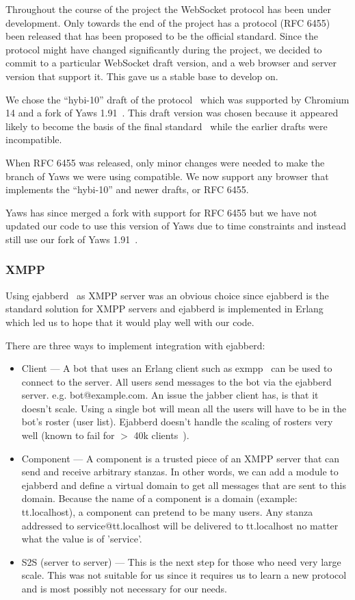 \documentclass[11pt,a4paper]{report}
\begin{document}
Throughout the course of the project the WebSocket protocol has
been under development. Only towards the end of the project has a protocol
(RFC 6455) been released that has been proposed to be the official standard.
Since the protocol might have changed significantly during the project, we
decided to commit to a particular WebSocket draft version, and a web browser and
server version that support it. This gave us a stable base to develop on.

We chose the ``hybi-10'' draft of the protocol~\cite{hybi-10} which was
supported by Chromium 14 and a fork of Yaws 1.91~\cite{yaws-fork}. This draft
version was chosen because it appeared likely to become the basis of the final
standard~\cite{new-websocket-google-blog} while the earlier drafts were
incompatible.

When RFC 6455 was released, only minor changes were needed to make the branch of
Yaws we were using compatible. We now support any browser that implements
the ``hybi-10'' and newer drafts, or RFC 6455.

Yaws has since merged a fork with support for RFC 6455 but we have not updated
our code to use this version of Yaws due to time constraints and instead still
use our fork of Yaws 1.91~\cite{our-yaws}.


\subsubsection{XMPP}
Using ejabberd~\cite{ejabberd} as XMPP server was an obvious choice since ejabberd is the
standard solution for XMPP servers and ejabberd is implemented
in Erlang which led us to hope that it would play well with our code.

There are three ways to implement integration with ejabberd:

\begin{itemize}
\item Client --- A bot that uses an Erlang client such as exmpp~\cite{exmpp} can be used to
connect to the server.
All users send messages to the bot via the ejabberd server. e.g. bot@example.com.
An issue the jabber client has, is that it doesn’t scale. Using a single bot
will mean all the users will have to be in the bot’s roster (user list).
Ejabberd doesn’t handle the scaling of rosters very well (known to fail for
$>$ 40k clients~\cite{40k-roster}).

\item Component --- A component is a trusted piece of an XMPP server that can send
and receive arbitrary stanzas.
In other words, we can add a module to ejabberd and define a virtual domain to
get all messages that are sent to this domain.
Because the name of a component is a domain (example: tt.localhost), a component
can pretend to be many users.
Any stanza addressed to service@tt.localhost will be delivered to tt.localhost
no matter what the value is of 'service'.
\item S2S (server to server) --- This is the next step for those who need very
large scale. This was not suitable for us since it requires us to learn a new
protocol and is most possibly not necessary for our needs.
\end{itemize}
\end{document}
